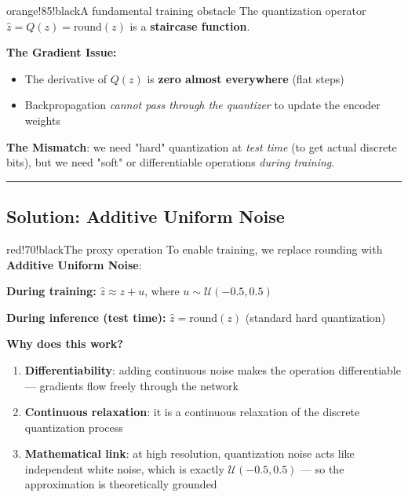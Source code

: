 \begin{calloutbox}{orange!85!black}{A fundamental training obstacle}
The quantization operator $\hat{z} = Q(z) = \text{round}(z)$ is a \textbf{staircase function}.

\textbf{The Gradient Issue:}
\begin{itemize}
\item The derivative of $Q(z)$ is \textbf{zero almost everywhere} (flat steps)
\item Backpropagation \textit{cannot pass through the quantizer} to update the encoder weights
\end{itemize}

\textbf{The Mismatch}: we need "hard" quantization at \textit{test time} (to get actual discrete bits), but we need "soft" or differentiable operations \textit{during training}.
\end{calloutbox}

\bigskip\hrule\bigskip

\subsection{Solution: Additive Uniform Noise}

\begin{calloutbox}{red!70!black}{The proxy operation}
To enable training, we replace rounding with \textbf{Additive Uniform Noise}:

\textbf{During training:} $\hat{z} \approx z + u$, where $u \sim \mathcal{U}(-0.5, 0.5)$

\textbf{During inference (test time):} $\hat{z} = \text{round}(z)$ (standard hard quantization)
\end{calloutbox}

\textbf{Why does this work?}

\begin{enumerate}
\item \textbf{Differentiability}: adding continuous noise makes the operation differentiable — gradients flow freely through the network
\item \textbf{Continuous relaxation}: it is a continuous relaxation of the discrete quantization process
\item \textbf{Mathematical link}: at high resolution, quantization noise acts like independent white noise, which is exactly $\mathcal{U}(-0.5, 0.5)$ — so the approximation is theoretically grounded
\end{enumerate}


